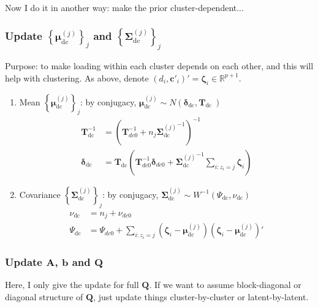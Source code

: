 \documentclass[]{article}
\begin{document}
Now I do it in another way: make the prior cluster-dependent...

\subsubsection{Update \(\left\{ \mathbf{\mu}_{\text{dc}}^{(j)} \right\}_{j}\) and \(\left\{ \mathbf{\Sigma}_{\text{dc}}^{(j)} \right\}_{j}\)} \label{loading prior}

Purpose: to make loading within each cluster depends on each other, and this will help with clustering. As above, denote \(\left( d_{i},\mathbf{c}'_{i} \right)' = \bm{\zeta}_{i} \in \mathbb{R}^{p + 1}\).
\begin{enumerate}
	\def\labelenumi{(\arabic{enumi})}
	\item
	Mean \(\left\{ \bm{\mu}_{\text{dc}}^{(j)} \right\}_{j}\): by
	conjugacy, \(\bm{\mu}_{\text{dc}}^{(j)} \sim N\left( \bm{\delta}_{\text{dc}},\mathbf{T}_{\text{dc}}\  \right)\)
	\begin{align*}
		\mathbf{T}_{\text{dc}}^{- 1} &= \left( \mathbf{T}_{dc0}^{- 1} + n_{j}{\mathbf{\Sigma}_{\text{dc}}^{(j)}}^{- 1} \right)^{- 1}\\
		\bm{\delta}_{\text{dc}} &= \mathbf{T}_{\text{dc}}\left( \mathbf{T}_{dc0}^{- 1}\bm{\delta}_{dc0} + {\mathbf{\Sigma}_{\text{dc}}^{(j)}}^{- 1}\sum_{i:z_{i} = j}^{}\bm{\zeta}_{i} \right)
	\end{align*}
	\item
	Covariance \(\left\{ \mathbf{\Sigma}_{\text{dc}}^{(j)} \right\}_{j}\): by conjugacy, \(\mathbf{\Sigma}_{\text{dc}}^{(j)} \sim W^{- 1}\left( \Psi_{\text{dc}},\nu_{\text{dc}} \right)\)
	\begin{align*}
		\nu_{\text{dc}} &= n_{j} + \nu_{dc0}\\
		\Psi_{\text{dc}} &= \Psi_{dc0} + \sum_{i:z_{i} = j}^{}{\left( \bm{\zeta}_{i} - \bm{\mu}_{\text{dc}}^{(j)} \right)\left( \bm{\zeta}_{i} - \bm{\mu}_{\text{dc}}^{(j)} \right)'}
	\end{align*}
\end{enumerate}

\subsubsection{Update \(\mathbf{A}\), \(\mathbf{b}\) and \(\mathbf{Q}\)} 
Here, I only give the update for full \(\mathbf{Q}\). If we want to assume block-diagonal or diagonal structure of \(\mathbf{Q}\), just update things cluster-by-cluster or latent-by-latent.
\end{document}
